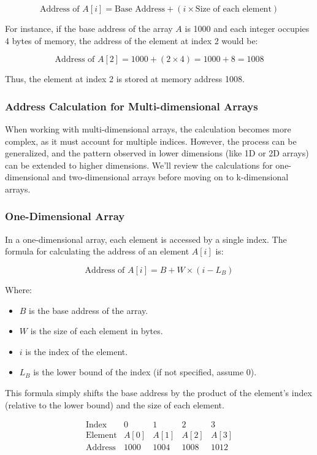 \documentclass[12pt, oneside]{book}
\begin{document}
\[
\text{Address of } A[i] = \text{Base Address} + (i \times \text{Size of each element})
\]

For instance, if the base address of the array \( A \) is 1000 and each integer occupies 4 bytes of memory, the address of the element at index 2 would be:

\[
\text{Address of } A[2] = 1000 + (2 \times 4) = 1000 + 8 = 1008
\]

Thus, the element at index 2 is stored at memory address 1008.

\subsubsection{Address Calculation for Multi-dimensional Arrays}

When working with multi-dimensional arrays, the calculation becomes more complex, as it must account for multiple indices. However, the process can be generalized, and the pattern observed in lower dimensions (like 1D or 2D arrays) can be extended to higher dimensions. We'll review the calculations for one-dimensional and two-dimensional arrays before moving on to k-dimensional arrays.

\subsubsection{One-Dimensional Array}

In a one-dimensional array, each element is accessed by a single index. The formula for calculating the address of an element \( A[i] \) is:

\[
\text{Address of } A[i] = B + W \times (i - L_B)
\]

Where:
\begin{itemize}
	\item \( B \) is the base address of the array.
	\item \( W \) is the size of each element in bytes.
	\item \( i \) is the index of the element.
	\item \( L_B \) is the lower bound of the index (if not specified, assume 0).
\end{itemize}

This formula simply shifts the base address by the product of the element's index (relative to the lower bound) and the size of each element.

\[
\begin{array}{c|c|c|c|c}
	\text{Index} & 0 & 1 & 2 & 3 \\
	\hline
	\text{Element} & A[0] & A[1] & A[2] & A[3] \\
	\hline
	\text{Address} & 1000 & 1004 & 1008 & 1012 \\
\end{array}
\]
\end{document}
